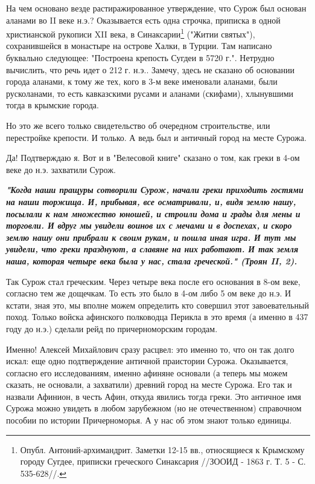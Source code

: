 На чем основано везде растиражированное утверждение, что Сурож был основан
аланами во II веке н.э.? Оказывается есть одна строчка, приписка в одной
христианской рукописи XII века, в Синаксарии\footnote{
Опубл. Антоний-архимандрит. Заметки 12-15 вв., относящиеся к Крымскому городу Сугдее, приписки греческого Синаксария //ЗООИД - 1863 г. Т. 5 - С. 535-628//.
} ("Житии святых"),
сохранившейся в монастыре на острове Халки, в Турции. Там написано буквально
следующее: "Построена крепость Сугдеи в 5720 г.". Нетрудно вычислить, что речь
идет о 212 г. н.э.. Замечу, здесь не сказано об основании города аланами, к
тому же тех, кого в 3-м веке именовали аланами, были русколанами, то есть
кавказскими русами и аланами (скифами), хлынувшими тогда в крымские города.

Но это же всего только свидетельство об очередном строительстве, или
перестройке крепости. И только. А ведь был и античный город на месте Сурожа.

Да! Подтверждаю я. Вот и в "Велесовой книге" сказано о том, как греки в 4-ом
веке до н.э. захватили Сурож. 

\begin{leftbar}
  \begingroup
    \em\Large\bfseries\color{blue}
"Когда наши пращуры сотворили Сурож, начали греки приходить гостями на
наши торжища. И, прибывая, все осматривали, и, видя землю нашу, посылали
к нам множество юношей, и строили дома и грады для мены и торговли. И
вдруг мы увидели воинов их с мечами и в доспехах, и скоро землю нашу они
прибрали к своим рукам, и пошла иная игра. И тут мы увидели, что греки
празднуют, а славяне на них работают. И так земля наша, которая четыре
века была у нас, стала греческой." (Троян II, 2).
  \endgroup
\end{leftbar}

Так Сурож стал греческим. Через четыре века после его основания в 8-ом веке,
согласно тем же дощечкам. То есть это было в 4-ом либо 5 ом веке до н.э. И
кстати, зная это, мы вполне можем определить кто совершил этот завоевательный
поход. Только войска афинского полководца Перикла в это время (а именно в 437
году до н.э.) сделали рейд по причерноморским городам.

Именно! Алексей Михайлович сразу расцвел: это именно то, что он так долго
искал: еще одно подтверждение античной праистории Сурожа. Ока­зывается,
согласно его исследованиям, именно афиняне основали (а теперь мы можем сказать,
не основали, а захватили) древний город на месте Сурожа. Его так и назвали
Афинион, в честь Афин, откуда явились тогда греки. Это античное имя Сурожа
можно увидеть в любом зарубежном (но не отечественном) справочном пособии по
истории Причерноморья. А у нас об этом знают только единицы.

